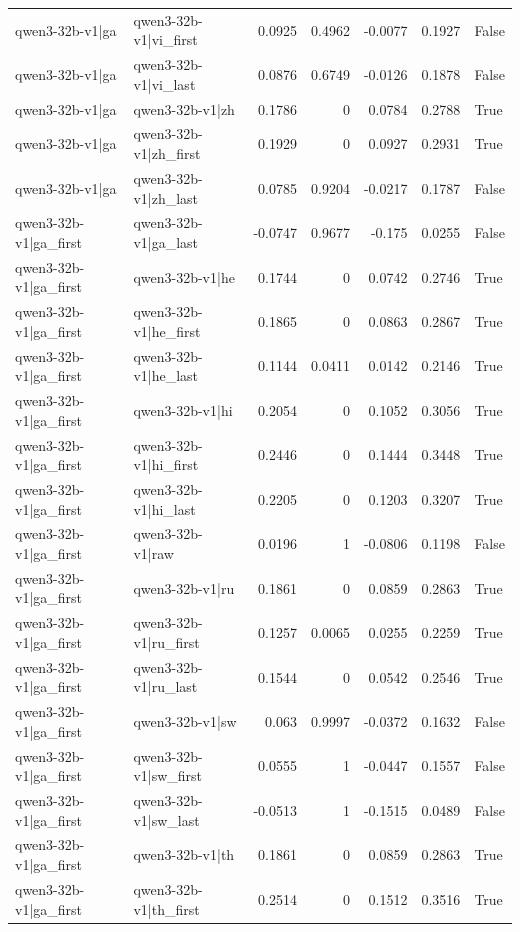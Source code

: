 \begin{table}
\begin{tabular}{l l r r r r l}
qwen3-32b-v1|ga & qwen3-32b-v1|vi_first & 0.0925 & 0.4962 & -0.0077 & 0.1927 & False \\
qwen3-32b-v1|ga & qwen3-32b-v1|vi_last & 0.0876 & 0.6749 & -0.0126 & 0.1878 & False \\
qwen3-32b-v1|ga & qwen3-32b-v1|zh & 0.1786 & 0 & 0.0784 & 0.2788 & True \\
qwen3-32b-v1|ga & qwen3-32b-v1|zh_first & 0.1929 & 0 & 0.0927 & 0.2931 & True \\
qwen3-32b-v1|ga & qwen3-32b-v1|zh_last & 0.0785 & 0.9204 & -0.0217 & 0.1787 & False \\
qwen3-32b-v1|ga_first & qwen3-32b-v1|ga_last & -0.0747 & 0.9677 & -0.175 & 0.0255 & False \\
qwen3-32b-v1|ga_first & qwen3-32b-v1|he & 0.1744 & 0 & 0.0742 & 0.2746 & True \\
qwen3-32b-v1|ga_first & qwen3-32b-v1|he_first & 0.1865 & 0 & 0.0863 & 0.2867 & True \\
qwen3-32b-v1|ga_first & qwen3-32b-v1|he_last & 0.1144 & 0.0411 & 0.0142 & 0.2146 & True \\
qwen3-32b-v1|ga_first & qwen3-32b-v1|hi & 0.2054 & 0 & 0.1052 & 0.3056 & True \\
qwen3-32b-v1|ga_first & qwen3-32b-v1|hi_first & 0.2446 & 0 & 0.1444 & 0.3448 & True \\
qwen3-32b-v1|ga_first & qwen3-32b-v1|hi_last & 0.2205 & 0 & 0.1203 & 0.3207 & True \\
qwen3-32b-v1|ga_first & qwen3-32b-v1|raw & 0.0196 & 1 & -0.0806 & 0.1198 & False \\
qwen3-32b-v1|ga_first & qwen3-32b-v1|ru & 0.1861 & 0 & 0.0859 & 0.2863 & True \\
qwen3-32b-v1|ga_first & qwen3-32b-v1|ru_first & 0.1257 & 0.0065 & 0.0255 & 0.2259 & True \\
qwen3-32b-v1|ga_first & qwen3-32b-v1|ru_last & 0.1544 & 0 & 0.0542 & 0.2546 & True \\
qwen3-32b-v1|ga_first & qwen3-32b-v1|sw & 0.063 & 0.9997 & -0.0372 & 0.1632 & False \\
qwen3-32b-v1|ga_first & qwen3-32b-v1|sw_first & 0.0555 & 1 & -0.0447 & 0.1557 & False \\
qwen3-32b-v1|ga_first & qwen3-32b-v1|sw_last & -0.0513 & 1 & -0.1515 & 0.0489 & False \\
qwen3-32b-v1|ga_first & qwen3-32b-v1|th & 0.1861 & 0 & 0.0859 & 0.2863 & True \\
qwen3-32b-v1|ga_first & qwen3-32b-v1|th_first & 0.2514 & 0 & 0.1512 & 0.3516 & True \\

\end{tabular}
\end{table}

